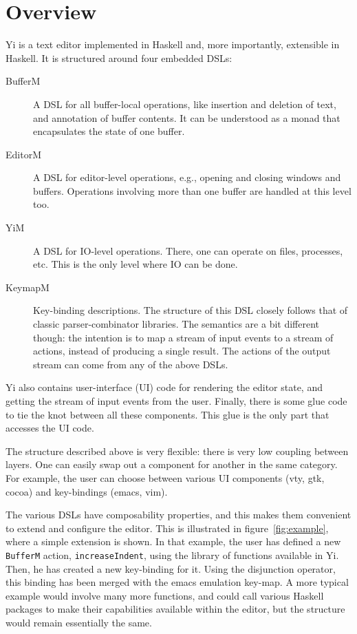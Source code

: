 \documentclass[9pt,indentedstyle]{sigplanconf}
\begin{document}
\section{Overview}

Yi is a text editor implemented in Haskell and, more importantly, extensible in
Haskell. It is structured around four embedded DSLs:
\begin{description}
\item[BufferM] A DSL for all buffer-local operations, like insertion
  and deletion of text, and annotation of buffer contents. It
  can be understood as a monad that encapsulates the state of one buffer.
\item[EditorM] A DSL for editor-level operations, e.g., opening and closing
  windows and buffers. Operations involving more than one buffer are
  handled at this level too.
\item[YiM] A DSL for IO-level operations. There, one can operate on files,
  processes, etc.  This is the only level where IO can be done.
\item[KeymapM] Key-binding descriptions. The structure of this DSL
  closely follows that of classic parser-combinator libraries.  The
  semantics are a bit different though: the intention is to map a
  stream of input events to a stream of actions, instead of producing
  a single result. The actions of the output stream can come from any
  of the above DSLs.
\end{description}
Yi also contains user-interface (UI) code for rendering the editor
state, and getting the stream of input events from the user.  Finally,
there is some glue code to tie the knot between all these
components. This glue is the only part that accesses the UI code.

The structure described above is very flexible: there is very low coupling between
layers. One can easily swap out a component for another in the same
category. For example, the user can choose between various UI
components (vty, gtk, cocoa) and key-bindings (emacs, vim).

The various DSLs have composability properties, and this makes them
convenient to extend and configure the editor. This is illustrated in
figure~\ref{fig:example}, where a simple extension is shown.  In that
example, the user has defined a new \texttt{BufferM} action,
\texttt{increaseIndent}, using the library of functions available in
Yi. Then, he has created a new key-binding for it. Using the
disjunction operator, this binding has been merged with the emacs
emulation key-map. A more typical example would involve many more
functions, and could call various Haskell packages to make their
capabilities available within the editor, but the structure would
remain essentially the same.
\end{document}
